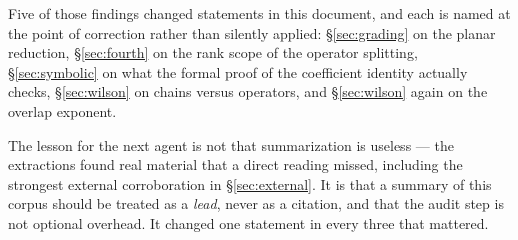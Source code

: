 Five of those findings changed statements in this document, and each is
named at the point of correction rather than silently applied:
\S\ref{sec:grading} on the planar reduction, \S\ref{sec:fourth} on the
rank scope of the operator splitting, \S\ref{sec:symbolic} on what the
formal proof of the coefficient identity actually checks,
\S\ref{sec:wilson} on chains versus operators, and \S\ref{sec:wilson}
again on the overlap exponent.

The lesson for the next agent is not that summarization is useless ---
the extractions found real material that a direct reading missed,
including the strongest external corroboration in
\S\ref{sec:external}. It is that a summary of this corpus should be
treated as a \emph{lead}, never as a citation, and that the audit step
is not optional overhead. It changed one statement in every three that
mattered.

